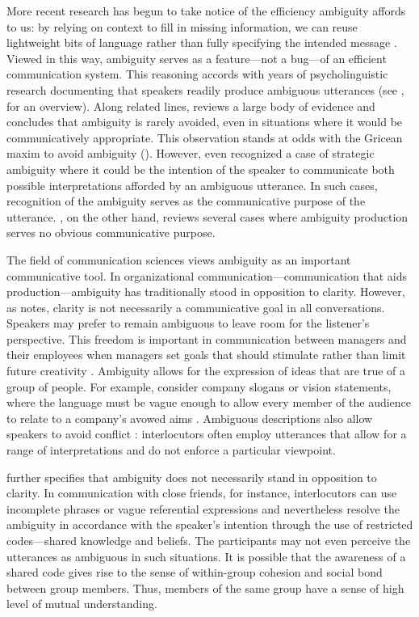 \documentclass[10pt,a4paper]{article}
\begin{document}
More recent research has begun to take notice of the efficiency ambiguity affords to us: by relying on context to fill in missing information, we can reuse lightweight bits of language rather than fully specifying the intended message \cite{levinson2000,piantadosietal2012,wasow2015}. 
Viewed in this way, ambiguity serves as a feature---not a bug---of an efficient communication system.
This reasoning accords with years of psycholinguistic research documenting that speakers readily produce ambiguous utterances (see , for an overview). 
Along related lines,  reviews a large body of evidence and concludes that ambiguity is rarely avoided, even in situations where it would be communicatively appropriate.
This observation stands at odds with the Gricean maxim to avoid ambiguity ().
However, even \citeauthor{grice1975} recognized a case of strategic ambiguity where it could be the intention of the speaker to communicate both possible interpretations afforded by an ambiguous utterance. In such cases, recognition of the ambiguity serves as the communicative purpose of the utterance. \citeauthor{wasow2015}, on the other hand, reviews several cases where ambiguity production serves no obvious communicative purpose.

The field of communication sciences views ambiguity as an important communicative tool.%
In organizational communication---communication that aids production---ambiguity has traditionally stood in opposition to clarity. However, as  notes, clarity is not necessarily a communicative goal in all conversations. Speakers may prefer to remain ambiguous to leave room for the listener's perspective. This freedom is important in communication between managers and their employees when managers set goals that should stimulate rather than limit future creativity \cite{mohr1983implications}. Ambiguity allows for the expression of ideas that are true of a group of people. For example, consider company slogans or vision statements, where the language must be vague enough to allow every member of the audience to relate to a company's avowed aims \cite{carmon2013}. Ambiguous descriptions also allow speakers to avoid conflict \cite{pascale1981art}: interlocutors often employ utterances that allow for a range of interpretations and do not enforce a particular viewpoint.

 further specifies that ambiguity does not necessarily stand in opposition to clarity. In communication with close friends, for instance, interlocutors can use incomplete phrases or vague referential expressions and nevertheless resolve the ambiguity in accordance with the speaker's intention through the use of restricted codes---shared knowledge and beliefs. The participants may not even perceive the utterances as ambiguous in such situations. It is possible that the awareness of a shared code gives rise to the sense of within-group cohesion and social bond between group members. Thus, members of the same group have a sense of high level of mutual understanding.
\end{document}
